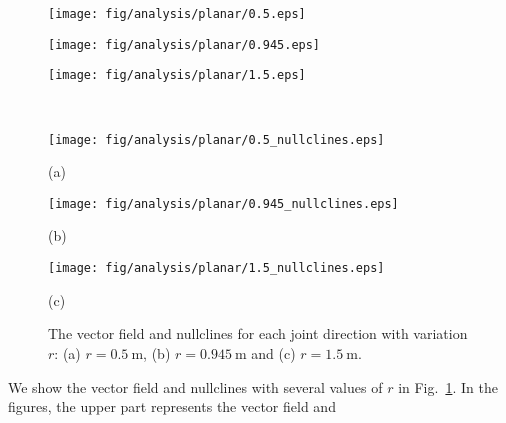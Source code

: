 \documentclass[preprint,12pt]{elsarticle}
\def\fig#1{{Fig.~\ref{fig:#1}}}
\def\unit#1{{~\mathrm{#1}}}
\begin{document}
%
\begin{figure}[t]
  \centering
  \begin{minipage}[t]{0.30\linewidth}
    \centering
    \texttt{[image: fig/analysis/planar/0.5.eps]}
    \hspace{2mm}
  \end{minipage}
  \begin{minipage}[t]{0.30\linewidth}
    \centering
    \texttt{[image: fig/analysis/planar/0.945.eps]}
    \hspace{2mm}
  \end{minipage}
  \begin{minipage}[t]{0.30\linewidth}
    \centering
    \texttt{[image: fig/analysis/planar/1.5.eps]}
    \hspace{2mm}
  \end{minipage}\\
  \vspace{-3mm}
  \begin{minipage}[t]{0.30\linewidth}
    \centering
    \texttt{[image: fig/analysis/planar/0.5\_nullclines.eps]}
    \footnotesize\par{(a)}
    \hspace{2mm}
  \end{minipage}
  \begin{minipage}[t]{0.30\linewidth}
    \centering
    \texttt{[image: fig/analysis/planar/0.945\_nullclines.eps]}
    \footnotesize\par{(b)}
    \hspace{2mm}
  \end{minipage}
  \begin{minipage}[t]{0.30\linewidth}
    \centering
    \texttt{[image: fig/analysis/planar/1.5\_nullclines.eps]}
    \footnotesize\par{(c)}
    \hspace{2mm}
  \end{minipage}
  \caption{The vector field and nullclines for each joint direction with variation $r$:
    (a) $r = 0.5\unit{m}$, (b) $r = 0.945\unit{m}$ and (c) $r = 1.5\unit{m}$.}
    \label{fig:BIF_VEC}
\end{figure}
%
We show the vector field and nullclines with several values of $r$ in \fig{BIF_VEC}.
In the figures,
the upper part represents the vector field and
\end{document}

